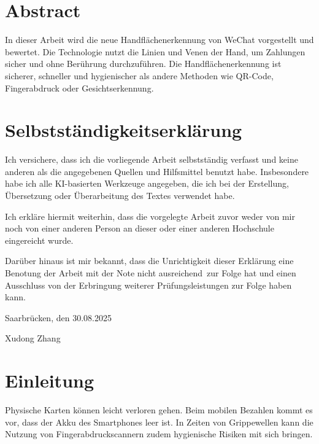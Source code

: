\documentclass[paper=a4,fontsize=12pt,ngerman]{scrartcl}
\begin{document}
\pagestyle{plain}



\section*{Abstract}
In dieser Arbeit wird die neue Handflächenerkennung von WeChat vorgestellt und bewertet. Die Technologie nutzt die Linien und Venen der Hand, um Zahlungen sicher und ohne Berührung durchzuführen. Die Handflächenerkennung ist sicherer, schneller und hygienischer als andere Methoden wie QR-Code, Fingerabdruck oder Gesichtserkennung.


\newpage
\section*{Selbstständigkeitserklärung}
Ich versichere, dass ich die vorliegende Arbeit selbstständig verfasst und 
keine anderen als die angegebenen Quellen und Hilfsmittel benutzt habe.
Insbesondere habe ich alle KI-basierten Werkzeuge angegeben, die ich bei
der Erstellung, Übersetzung oder Überarbeitung des Textes verwendet habe.

Ich erkläre hiermit weiterhin, dass die vorgelegte Arbeit zuvor weder von mir 
noch von einer anderen Person an dieser oder einer anderen Hochschule 
eingereicht wurde.

Darüber hinaus ist mir bekannt, dass die Unrichtigkeit dieser Erklärung eine 
Benotung der Arbeit mit der Note \glqq nicht ausreichend\grqq \ zur Folge hat 
und einen Ausschluss von der Erbringung weiterer Prüfungsleistungen zur Folge 
haben kann.
\bigskip
 
Saarbrücken, den 30.08.2025

\smallskip
Xudong Zhang




\clearpage
\tableofcontents 

\clearpage
{}


\section{Einleitung}
Physische Karten können leicht verloren gehen. Beim mobilen Bezahlen kommt es vor, dass der Akku des Smartphones leer ist. In Zeiten von Grippewellen kann die Nutzung von Fingerabdruckscannern zudem hygienische Risiken mit sich bringen.
\end{document}
